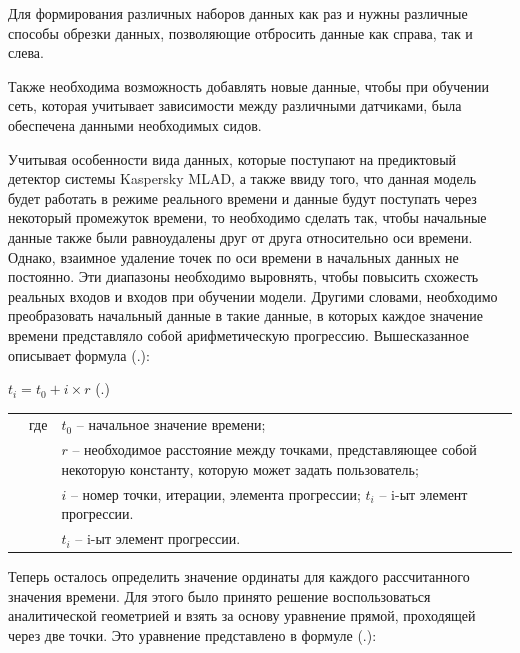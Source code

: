 {  \par \redline Для формирования различных наборов данных как раз и нужны различные способы обрезки данных, позволяющие отбросить данные как справа, так и слева. 
 
  \par \redline Также необходима возможность добавлять новые данные, чтобы при обучении сеть, которая учитывает зависимости между различными датчиками, была обеспечена данными необходимых сидов.  

  \par \redline Учитывая особенности вида данных, которые поступают на предиктовый детектор системы Kaspersky MLAD, а также ввиду того, что данная модель будет работать в режиме реального времени и данные будут поступать через некоторый промежуток времени, то необходимо сделать так, чтобы начальные данные также были равноудалены друг от друга относительно оси времени. Однако, взаимное удаление точек по оси времени в начальных данных не постоянно. Эти диапазоны необходимо выровнять, чтобы повысить схожесть реальных входов и входов при обучении модели. Другими словами, необходимо преобразовать начальный данные в такие данные, в которых каждое значение времени представляло собой арифметическую прогрессию. Вышесказанное описывает формула (\thechaptercntr .\theformulacntr):

	\formulaspace \par \redline 
    $t_i = t_0 + i \times r$
	  \hfill (\thechaptercntr .\theformulacntr) \redline
	\formulaspace \addtocounter{formulacntr}{1}

  \begin{tabular}{p{}p{}p{}}
		& где  & $t_0$ {--} начальное значение времени; \\
		& 	   & $r$ {--} необходимое расстояние между точками, представляющее собой некоторую константу, которую может задать пользователь; \\
    & 	   & $i$ {--} номер точки, итерации, элемента прогрессии; $t_i$ {--} i-ыт элемент прогрессии.  \\
    & 	   & $t_i$ {--} i-ыт элемент прогрессии. \\
  \end{tabular}

  \par \redline Теперь осталось определить значение ординаты для каждого рассчитанного значения времени. Для этого было принято решение воспользоваться аналитической геометрией и взять за основу уравнение прямой, проходящей через две точки. Это уравнение представлено в формуле (\thechaptercntr .\theformulacntr):  

}
